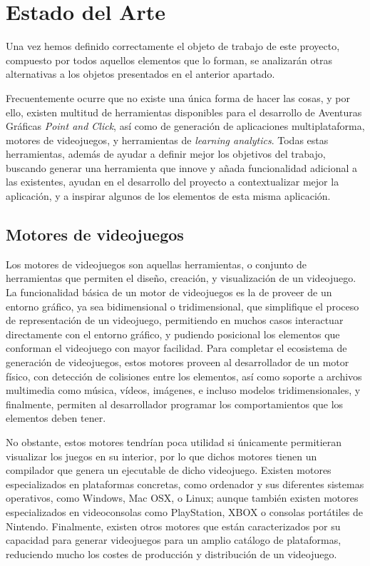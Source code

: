 \chapter{Estado del Arte}
\label{estadodelarte}

Una vez hemos definido correctamente el objeto de trabajo de este proyecto, compuesto por todos aquellos elementos que lo forman, se analizarán otras alternativas a los objetos presentados en el anterior apartado. 

Frecuentemente ocurre que no existe una única forma de hacer las cosas, y por ello, existen multitud de herramientas disponibles para el desarrollo de Aventuras Gráficas \textit{Point and Click}, así como de generación de aplicaciones multiplataforma, motores de videojuegos, y herramientas de \textit{learning analytics}. Todas estas herramientas, además de ayudar a definir mejor los objetivos del trabajo, buscando generar una herramienta que innove y añada funcionalidad adicional a las existentes, ayudan en el desarrollo del proyecto a contextualizar mejor la aplicación, y a inspirar algunos de los elementos de esta misma aplicación.

\section{Motores de videojuegos}
\label{motoresdevideojuegos}

Los motores de videojuegos son aquellas herramientas, o conjunto de herramientas que permiten el diseño, creación, y visualización de un videojuego. La funcionalidad básica de un motor de videojuegos es la de proveer de un entorno gráfico, ya sea bidimensional o tridimensional, que simplifique el proceso de representación de un videojuego, permitiendo en muchos casos interactuar directamente con el entorno gráfico, y pudiendo posicional los elementos que conforman el videojuego con mayor facilidad. Para completar el ecosistema de generación de videojuegos, estos motores proveen al desarrollador de un motor físico, con detección de colisiones entre los elementos, así como soporte a archivos multimedia como música, vídeos, imágenes, e incluso modelos tridimensionales, y finalmente, permiten al desarrollador programar los comportamientos que los elementos deben tener.

No obstante, estos motores tendrían poca utilidad si únicamente permitieran visualizar los juegos en su interior, por lo que dichos motores tienen un compilador que genera un ejecutable de dicho videojuego. Existen motores especializados en plataformas concretas, como ordenador y sus diferentes sistemas operativos, como Windows, Mac OSX, o Linux; aunque también existen motores especializados en videoconsolas como PlayStation, XBOX o consolas portátiles de Nintendo. Finalmente, existen otros motores que están caracterizados por su capacidad para generar videojuegos para un amplio catálogo de plataformas, reduciendo mucho los costes de producción y distribución de un videojuego.

